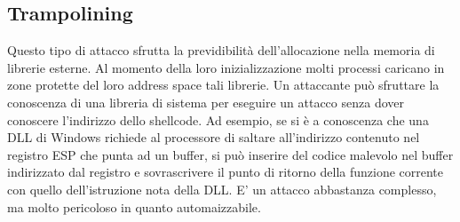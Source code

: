 \subsection{Trampolining}
Questo tipo di attacco sfrutta la previdibilità dell'allocazione nella memoria di librerie esterne. Al momento della loro inizializzazione molti processi caricano in zone protette del loro address space tali librerie. Un attaccante può sfruttare la conoscenza di una libreria di sistema per eseguire un attacco senza dover conoscere l'indirizzo dello shellcode. Ad esempio, se si è a conoscenza che una DLL di Windows richiede al processore di saltare all'indirizzo contenuto nel registro ESP che punta ad un buffer, si può inserire del codice malevolo nel buffer indirizzato dal registro e sovrascrivere il punto di ritorno della funzione corrente con quello dell'istruzione nota della DLL. E' un attacco abbastanza complesso, ma molto pericoloso in quanto automaizzabile.
